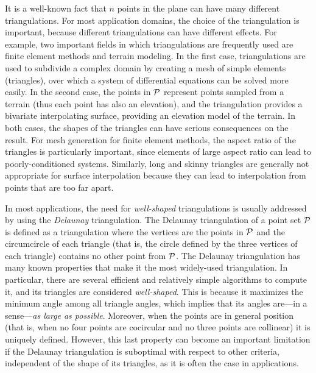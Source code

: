 \documentclass {journal}
\newcommand{\Pts}{\cal P}
\begin{document}
It is a well-known fact that $n$ points in the plane can have many different triangulations.
For most application domains, the choice of the triangulation is important, because different triangulations can have different effects.
For example, two important fields in which triangulations are frequently used are finite element methods and terrain modeling.
In the first case, triangulations are used to subdivide a complex domain by creating a mesh of simple elements (triangles), over which a system of differential equations can be solved more easily.
In the second case, the points in $\Pts$ represent points sampled from a terrain (thus each point has also an elevation), and the triangulation provides a bivariate interpolating surface, providing an elevation model of the terrain.
In both cases, the shapes of the triangles can have serious consequences on the result.
For mesh generation for finite element methods, the aspect ratio of the triangles is particularly important, since elements of large aspect ratio can lead to poorly-conditioned systems.
Similarly, long and skinny triangles are generally not appropriate for surface interpolation because they can lead to interpolation from points that are too far apart.

In most applications, the need for \emph{well-shaped}
triangulations is usually addressed by using the \emph{Delaunay}
triangulation. The Delaunay triangulation of a point set $\Pts$ is
defined as a triangulation where the vertices are the points in
$\Pts$ and the circumcircle of each triangle (that is, the circle
defined by the three vertices of each triangle) contains no other
point from $\Pts$. The Delaunay triangulation has many known
properties that make it the most widely-used triangulation. In
particular, there are several efficient and relatively simple
algorithms to compute it, and its triangles are considered
\emph{well-shaped}. This is because it maximizes the minimum angle
among all triangle angles, which implies that its angles are---in
a sense---\emph{as large as possible}. Moreover, when the points
are in general position (that is, when no four points are
cocircular and no three points are collinear) it is uniquely
defined. However, this last property can become an important
limitation if the Delaunay triangulation is suboptimal with
respect to other criteria, independent of the shape of its
triangles, as it is often the case in applications.
\end{document}
